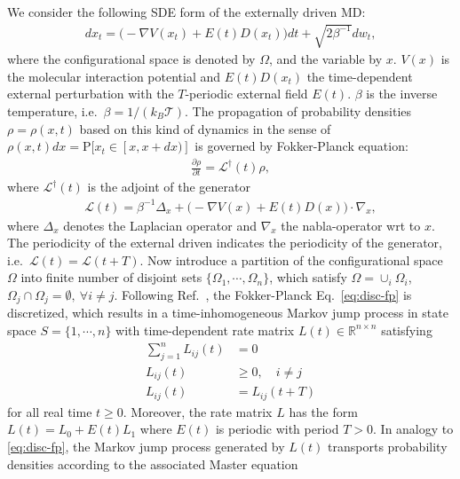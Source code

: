 \documentclass[aps, pre, preprint,unsortedaddress,a4paper,onecolumn]{revtex4}
\newcommand{\vect}[1]{#1}
\newcommand{\ml}[0]{\mathcal {L}}
\newcommand{\prob}{\textrm{P}}
\begin{document}
We consider  the following SDE form of the externally driven MD:
\begin{align}
  \label{eq:disc-1}
  d\vect x_t = \Big(-\nabla V(\vect x_t) + E(t) D(\vect x_t)\Big)dt + \sqrt{2\beta^{-1}} d\vect w_t, 
\end{align}
where the configurational space is denoted by $\Omega$, and the variable by
$\vect x$.   $V(\vect x)$ is the molecular interaction potential and
$E(t)D(x_t)$ the time-dependent external perturbation with the
$T$-periodic external field $E(t)$. $\beta$ is the inverse temperature,
i.e.~$\beta = 1/(k_B\mathcal T)$.
The propagation of probability
densities $\rho=\rho(\vect x,t)$ based on this kind of dynamics in the sense
of $\rho(\vect x,t)dx=\prob[\vect x_t\in [\vect x,\vect x+d\vect x)]$ is governed by
Fokker-Planck equation:
\begin{align}
  \label{eq:disc-fp}
  \frac{\partial \rho}{\partial t} = \ml^\dagger(t) \rho,
\end{align}
where $\ml^\dagger(t)$ is the adjoint of the generator
\begin{align}
  \label{eq:disc-3}
  \ml(t)=\beta^{-1}\Delta_{\vect x}+\Big(-\nabla V(\vect x) + E(t)D(\vect x)\Big)\cdot\nabla_{\vect x},
\end{align}
where $\Delta_{\vect x}$ denotes the Laplacian operator and $\nabla_{\vect x}$
the nabla-operator wrt to $\vect x$. 
The periodicity of the external driven indicates the periodicity of the generator,
i.e.~$\ml(t) = \ml(t+T)$.  Now
introduce a partition of the configurational space $\Omega$ into finite number of disjoint
sets $\{ \Omega_1, \cdots, \Omega_n\}$, which satisfy $\Omega = \cup_i \Omega_i$,
$\Omega_j\cap \Omega_j = \emptyset,\ \forall i\neq j$.
Following Ref.~\cite{latorre2011structure}, the Fokker-Planck Eq.~\ref{eq:disc-fp}
is discretized, which results in a time-inhomogeneous Markov jump process in state
space $S = \{1, \cdots, n\}$ with time-dependent rate
matrix $\vect L(t) \in \mathbb R^{n\times n}$ satisfying
\begin{align}\label{eq:disc-4}
\sum\limits_{j=1}^n L_{ij}(t) & =  0\\ \label{eq:disc-5}
L_{ij}(t) & \ge  0, \quad i\not= j\\
L_{ij}(t) & =  L_{ij}(t+T)
\end{align}
for all real time $t\geq 0$.
{Moreover,
the rate matrix $L$ has the form $\vect L(t)=\vect L_0+E(t)\vect L_1$
where $E(t)$ is periodic with period $T>0$.}
In analogy to \eqref{eq:disc-fp}, the Markov jump process generated by
$\vect L(t)$ transports probability densities according to the associated Master equation
\end{document}
